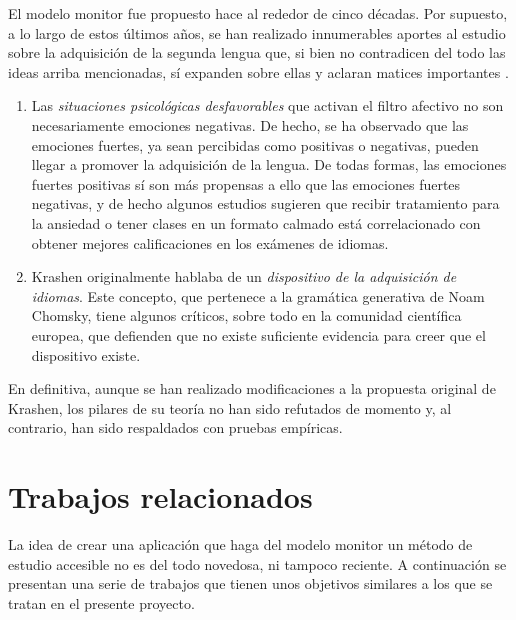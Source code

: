 El modelo monitor fue propuesto hace al rededor de cinco décadas. Por supuesto, a lo largo de estos últimos años, se han realizado innumerables aportes al estudio sobre la adquisición de la segunda lengua que, si bien no contradicen del todo las ideas arriba mencionadas, sí expanden sobre ellas y aclaran matices importantes \autocite{https://doi.org/10.1111/flan.12552}. \todo[¿Cuáles?]

\begin{enumerate}
	\item Las \textit{situaciones psicológicas desfavorables} que activan el filtro afectivo no son necesariamente emociones negativas. De hecho, se ha observado que las emociones fuertes, ya sean percibidas como positivas o negativas, pueden llegar a promover la adquisición de la lengua. De todas formas, las emociones fuertes positivas sí son más propensas a ello que las emociones fuertes negativas, y de hecho algunos estudios sugieren que recibir tratamiento para la ansiedad o tener clases en un formato calmado está correlacionado con obtener mejores calificaciones en los exámenes de idiomas. 
	\item Krashen originalmente hablaba de un \textit{dispositivo de la adquisición de idiomas}. Este concepto, que pertenece a la gramática generativa de Noam Chomsky, tiene algunos críticos, sobre todo en la comunidad científica europea, que defienden que no existe suficiente evidencia para creer que el dispositivo existe. \todo[referencia]
\end{enumerate}



En definitiva, aunque se han realizado modificaciones a la propuesta original de Krashen, los pilares de su teoría no han sido refutados de momento y, al contrario, han sido respaldados con pruebas empíricas.



\section{Trabajos relacionados}

La idea de crear una aplicación que haga del modelo monitor un método de estudio accesible no es del todo novedosa, ni tampoco reciente. A continuación se presentan una serie de trabajos que tienen unos objetivos similares a los que se tratan en el presente proyecto.

